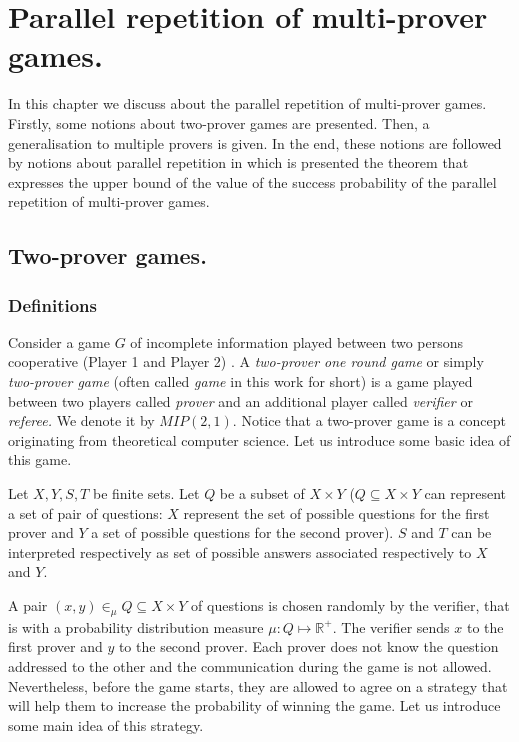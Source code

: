\chapter{Parallel repetition of multi-prover games.}


In this chapter we discuss about the parallel repetition of multi-prover games. Firstly, some notions about two-prover games are presented. Then, a generalisation to multiple  provers is given. In the end, these notions are followed by notions about parallel repetition in which is presented the theorem that expresses the upper bound of the value of the success probability of the parallel repetition of multi-prover games.


\section{Two-prover games.}


\subsection{Definitions} \label{tpg}

Consider a game $G$  of incomplete information played between two persons cooperative (Player 1 and Player 2)
\citep{verbitsky1996towards, raz2010parallel}.
A \textit{two-prover one round  game} or simply \textit{two-prover game} (often called \textit{game} in this work for short) is a game played between two players called \textit{prover} and an additional player called \textit{verifier} or \textit{referee.}
We denote it by $MIP(2,1)$.
Notice that a two-prover game is a concept originating from theoretical computer science. Let us introduce some basic idea of this game.

Let $X, Y, S, T$ be  finite sets. Let $Q$ be a subset of $X\times Y$ ($Q \subseteq X \times Y$ can represent a set of pair of questions: $X$ represent the set of possible questions for the first prover and $Y$ a set of possible questions for the second prover).    $S$ and $T$ can be interpreted respectively as set of possible answers associated respectively to $X$ and $Y$.

A pair $(x,y) \in_{\mu} Q \subseteq X\times Y$ of questions is chosen randomly  by the verifier, that is with a probability distribution measure $\mu: Q \longmapsto \mathbb{R}^+.$
The verifier sends $x$ to the first prover and $y$ to the second prover. Each prover does not know the question addressed to the other and the communication during the game is not allowed. Nevertheless, before the game starts, they are allowed to agree on a strategy that will help them to increase the probability of winning the game. Let us introduce some main idea of this strategy. 


